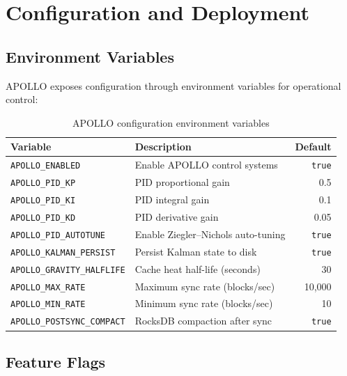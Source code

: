 \documentclass[11pt,a4paper]{article}
\begin{document}
\section{Configuration and Deployment}
\label{sec:config}

\subsection{Environment Variables}

APOLLO exposes configuration through environment variables for operational control:

\begin{table}[h]
\centering
\small
\begin{tabular}{llr}
\toprule
\textbf{Variable} & \textbf{Description} & \textbf{Default} \\
\midrule
\texttt{APOLLO\_ENABLED} & Enable APOLLO control systems & \texttt{true} \\
\texttt{APOLLO\_PID\_KP} & PID proportional gain & 0.5 \\
\texttt{APOLLO\_PID\_KI} & PID integral gain & 0.1 \\
\texttt{APOLLO\_PID\_KD} & PID derivative gain & 0.05 \\
\texttt{APOLLO\_PID\_AUTOTUNE} & Enable Ziegler--Nichols auto-tuning & \texttt{true} \\
\texttt{APOLLO\_KALMAN\_PERSIST} & Persist Kalman state to disk & \texttt{true} \\
\texttt{APOLLO\_GRAVITY\_HALFLIFE} & Cache heat half-life (seconds) & 30 \\
\texttt{APOLLO\_MAX\_RATE} & Maximum sync rate (blocks/sec) & 10,000 \\
\texttt{APOLLO\_MIN\_RATE} & Minimum sync rate (blocks/sec) & 10 \\
\texttt{APOLLO\_POSTSYNC\_COMPACT} & RocksDB compaction after sync & \texttt{true} \\
\bottomrule
\end{tabular}
\caption{APOLLO configuration environment variables}
\label{tab:config}
\end{table}

\subsection{Feature Flags}
\end{document}
